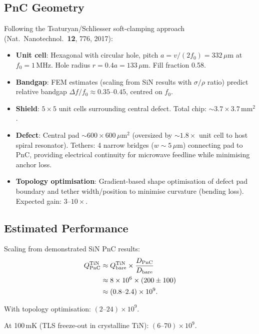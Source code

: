 \documentclass[11pt]{article}
\theoremstyle{remark}
\newcommand{\ee}[1]{\times 10^{#1}}
\begin{document}
\subsection{PnC Geometry}

Following the Tsaturyan/Schliesser soft-clamping approach
(Nat.\ Nanotechnol.\ \textbf{12}, 776, 2017):

\begin{itemize}[nosep]
  \item \textbf{Unit cell}: Hexagonal with circular hole, pitch
    $a = v/(2f_0) = 332\,\mu$m at $f_0 = 1$\,MHz.
    Hole radius $r = 0.4a = 133\,\mu$m. Fill fraction 0.58.
  \item \textbf{Bandgap}: FEM estimates (scaling from SiN results with
    $\sigma/\rho$ ratio) predict relative bandgap
    $\Delta f/f_0 \approx 0.35$--$0.45$, centred on $f_0$.
  \item \textbf{Shield}: $5\times 5$ unit cells surrounding central defect.
    Total chip: $\sim 3.7 \times 3.7$\,mm$^2$.
  \item \textbf{Defect}: Central pad $\sim 600 \times 600\,\mu$m$^2$
    (oversized by $\sim 1.8\times$ unit cell to host spiral resonator).
    Tethers: 4 narrow bridges ($w \sim 5\,\mu$m) connecting pad to PnC,
    providing electrical continuity for microwave feedline while
    minimising anchor loss.
  \item \textbf{Topology optimisation}: Gradient-based shape optimisation
    of defect pad boundary and tether width/position to minimise
    curvature (bending loss). Expected gain: $3$--$10\times$.
\end{itemize}

\subsection{Estimated Performance}

Scaling from demonstrated SiN PnC results:
\begin{align}
  Q_{\rm PnC}^{\rm TiN} &\approx Q_{\rm bare}^{\rm TiN}
    \times \frac{D_{\rm PnC}}{D_{\rm bare}} \nonumber \\
  &\approx 8\ee{6} \times (200 \pm 100) \nonumber \\
  &\approx (0.8\text{--}2.4)\ee{9}.
\end{align}

With topology optimisation: $(2\text{--}24)\ee{9}$.

At 100\,mK (TLS freeze-out in crystalline TiN):
$(6\text{--}70)\ee{9}$.
\end{document}
